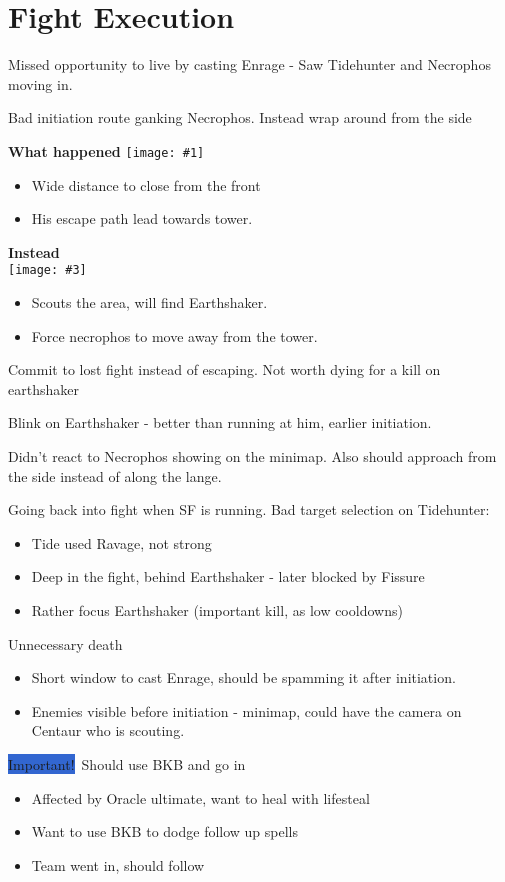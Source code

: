 \documentclass{article}
\newenvironment{remarks}
    {
        \begin{description}
            \setlength\itemsep{0em}
    }
    {
        \end{description}
    }
\newcommand{\logremark}[2]{\item[\textnormal{\logref{#1}}] #2}
\newcommand{\important}{\colorbox{highlight}{Important!}\ }
\newcommand{\logref}[1]{\textcolor{highlight}{#1}}
\newcommand{\twominimapscomment}[4]{
\begin{center}
    \begin{minipage}[t]{0.42\textwidth}
    \begin{center}
        \textbf{What happened}\hfill
        \texttt{[image: \#1]} 
        \begin{itemize}
        #2
        \end{itemize}
    \end{center}
    \end{minipage}
    \begin{minipage}[t]{0.42\textwidth}
        \begin{center}
        \textbf{Instead}\hfill\\
        \texttt{[image: \#3]}
        \begin{itemize}
        #4
        \end{itemize}
        \end{center}
    \end{minipage} 
    \end{center}
}
\begin{document}
\pagebreak

\section{Fight Execution}
\begin{remarks}
\logremark{11:28}{Missed opportunity to live by casting Enrage - Saw Tidehunter and Necrophos moving in.}

\logremark{13:59}{Bad initiation route ganking Necrophos. Instead wrap around from the side
\twominimapscomment{img/1359bad.pdf}{\item Wide distance to close from the front \item His escape path lead towards tower.}{img/1359good.pdf}{\item Scouts the area, will find Earthshaker.\item Force necrophos to move away from the tower.}}

\logremark{14:10}{ Commit to lost fight instead of escaping. Not worth dying for a kill on earthshaker}

\logremark{18:26}{Blink on Earthshaker - better than running at him, earlier initiation.}

\logremark{21:16}{Didn't react to Necrophos showing on the minimap. Also should approach from the side instead of along the lange.}

\logremark{33:15}{ Going back into fight when SF is running. Bad target selection on Tidehunter: 
\begin{itemize}
    \item Tide used Ravage, not strong
    \item Deep in the fight, behind Earthshaker - later blocked by Fissure
    \item Rather focus Earthshaker (important kill, as low cooldowns)
\end{itemize}}



\logremark{39:38}{Unnecessary death
\begin{itemize}
\item Short window to cast Enrage, should be spamming it after initiation.
\item Enemies visible before initiation - minimap, could have the camera on Centaur who is scouting.
\end{itemize}
        }

\logremark{45:08}{\important Should use BKB and go in
\begin{itemize}
\item Affected by Oracle ultimate, want to heal with lifesteal
\item Want to use BKB to dodge follow up spells
\item Team went in, should follow
    \end{itemize}}


\end{remarks}
\end{document}
